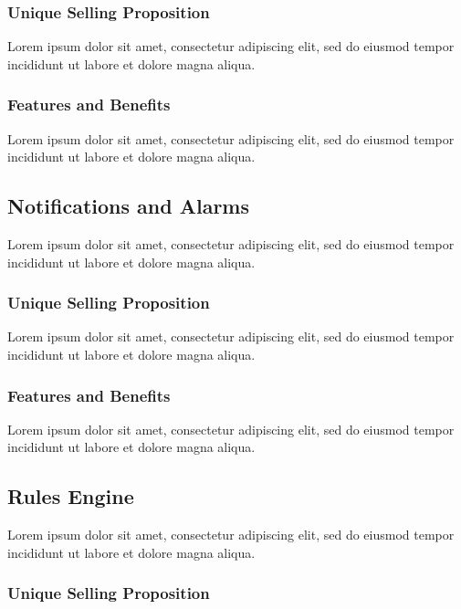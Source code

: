 \subsubsection*{Unique Selling Proposition}
Lorem ipsum dolor sit amet, consectetur adipiscing elit, sed do eiusmod tempor incididunt ut labore et dolore magna aliqua.

\subsubsection*{Features and Benefits}
Lorem ipsum dolor sit amet, consectetur adipiscing elit, sed do eiusmod tempor incididunt ut labore et dolore magna aliqua.


\subsection{Notifications and Alarms}
Lorem ipsum dolor sit amet, consectetur adipiscing elit, sed do eiusmod tempor incididunt ut labore et dolore magna aliqua.

\subsubsection*{Unique Selling Proposition}
Lorem ipsum dolor sit amet, consectetur adipiscing elit, sed do eiusmod tempor incididunt ut labore et dolore magna aliqua.

\subsubsection*{Features and Benefits}
Lorem ipsum dolor sit amet, consectetur adipiscing elit, sed do eiusmod tempor incididunt ut labore et dolore magna aliqua.


\subsection{Rules Engine}
Lorem ipsum dolor sit amet, consectetur adipiscing elit, sed do eiusmod tempor incididunt ut labore et dolore magna aliqua.

\subsubsection*{Unique Selling Proposition}


